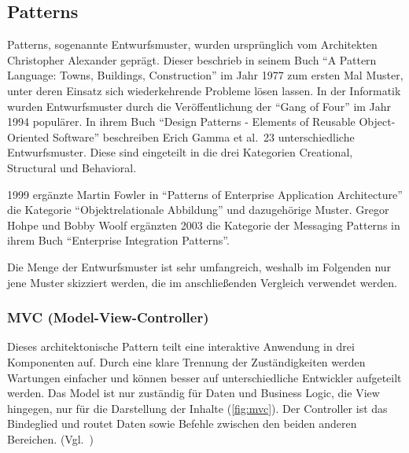 \newpage

\subsection{Patterns}
Patterns, sogenannte Entwurfsmuster, wurden ursprünglich vom Architekten Christopher Alexander geprägt.
Dieser beschrieb in seinem Buch \enquote{A Pattern Language: Towns, Buildings, Construction}\cite{a-pattern-language} im Jahr 1977 zum ersten Mal Muster, unter deren Einsatz sich wiederkehrende Probleme lösen lassen.
In der Informatik wurden Entwurfsmuster durch die Veröffentlichung der \enquote{Gang of Four} im Jahr 1994 populärer.
In ihrem Buch \enquote{Design Patterns - Elements of Reusable Object-Oriented Software}\cite{gamma-design-patterns} beschreiben Erich Gamma et al.\ 23 unterschiedliche Entwurfsmuster.
Diese sind eingeteilt in die drei Kategorien Creational, Structural und Behavioral.

1999 ergänzte Martin Fowler in \enquote{Patterns of Enterprise Application Architecture}\cite{patterns-of-enterprise-application-architecture} die Kategorie \enquote{Objektrelationale Abbildung} und dazugehörige Muster.
Gregor Hohpe und Bobby Woolf ergänzten 2003 die Kategorie der Messaging Patterns in ihrem Buch \enquote{Enterprise Integration Patterns}\cite{enterprise-integration-patterns}.

Die Menge der Entwurfsmuster ist sehr umfangreich, weshalb im Folgenden nur jene Muster skizziert werden, die im anschließenden Vergleich verwendet werden.

\subsubsection{MVC (Model-View-Controller)}
Dieses architektonische Pattern teilt eine interaktive Anwendung in drei Komponenten auf.
Durch eine klare Trennung der Zuständigkeiten werden Wartungen einfacher und können besser auf unterschiedliche Entwickler aufgeteilt werden.
Das Model ist nur zuständig für Daten und Business Logic, die View hingegen, nur für die Darstellung der Inhalte (\ref{fig:mvc}).
Der Controller ist das Bindeglied und routet Daten sowie Befehle zwischen den beiden anderen Bereichen.
(Vgl.~\cite{buschmann-pattern-oriented-software-architecture})

